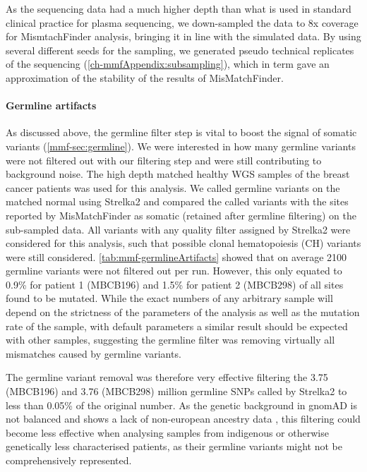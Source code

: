 As the sequencing data had a much higher depth than what is used in standard clinical practice for plasma sequencing, we down-sampled the data to 8x coverage for MismtachFinder analysis, bringing it in line with the simulated data. By using several different seeds for the sampling, we generated pseudo technical replicates of the sequencing (\autoref{ch-mmfAppendix:subsampling}), which in term gave an approximation of the stability of the results of MisMatchFinder.


\paragraph{Germline artifacts}
\label{mmf-sec:germlineArtifacts}
As discussed above, the germline filter step is vital to boost the signal of somatic variants (\autoref{mmf-sec:germline}). We were interested in how many germline variants were not filtered out with our filtering step and were still contributing to background noise. The high depth matched healthy WGS samples of the breast cancer patients was used for this analysis. We called germline variants on the matched normal using Strelka2 and compared the called variants with the sites reported by MisMatchFinder as somatic (retained after germline filtering) on the sub-sampled data. All variants with any quality filter assigned by Strelka2 were considered for this analysis, such that possible clonal hematopoiesis (CH) variants were still considered. \autoref{tab:mmf-germlineArtifacts} showed that on average 2100 germline variants were not filtered out per run. However, this only equated to 0.9\% for patient 1 (MBCB196) and 1.5\% for patient 2 (MBCB298) of all sites found to be mutated. While the exact numbers of any arbitrary sample will depend on the strictness of the parameters of the analysis as well as the mutation rate of the sample, with default parameters a similar result should be expected with other samples, suggesting the germline filter was removing virtually all mismatches caused by germline variants.

The germline variant removal was therefore very effective filtering the 3.75 (MBCB196) and 3.76 (MBCB298) million germline SNPs called by Strelka2 to less than 0.05\% of the original number. As the genetic background in gnomAD is not balanced and shows a lack of non-european ancestry data \cite{Tiao2020}, this filtering could become less effective when analysing samples from indigenous or otherwise genetically less characterised patients, as their germline variants might not be comprehensively represented.

